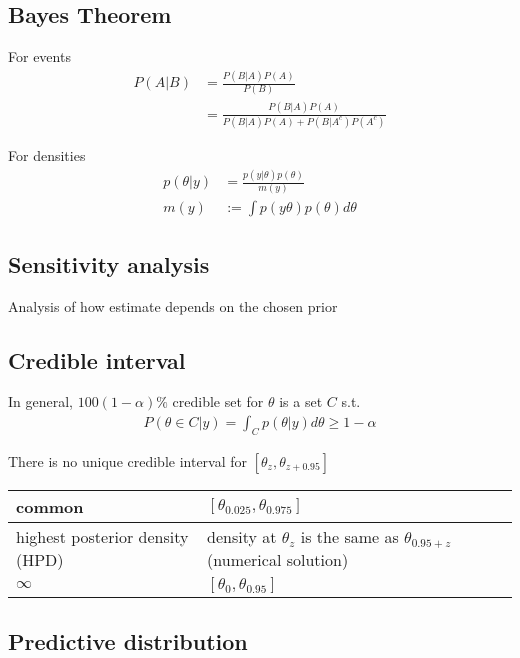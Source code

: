     \subsection{Bayes Theorem}
    For events
    \begin{align*}
        P(A|B) &= \frac{P(B|A)P(A)}{P(B)}\\
               &= \frac{P(B|A)P(A)}{P(B|A)P(A)+P(B|A^c)P(A^c)}
    \end{align*}

    For densities
    \begin{align*}
        p(\theta|y) &= \frac{p(y|\theta)p(\theta)}{m(y)}\\
        m(y) &:= \int p(y\theta)p(\theta)d\theta
    \end{align*}

    \subsection{Sensitivity analysis}
    Analysis of how estimate depends on the chosen prior

    \subsection{Credible interval}

    In general, $100(1-\alpha)\%$ credible set for $\theta$
    is a set $C$ s.t.
    \begin{align*}
        P(\theta \in C | y) = \int_C p(\theta|y) d\theta
        \geq 1 - \alpha
    \end{align*}

    There is no unique credible interval for $[\theta_z,
    \theta_{z+0.95}]$
    \begin{tabulary}{\linewidth}{L | L}
        \hline
        common & $[\theta_{0.025}, \theta_{0.975}]$\\
        \hline
        highest posterior density (HPD) & density at
        $\theta_z$ is the same as $\theta_{0.95+z}$
        (numerical solution)\\
        \hline
        $\infty$ & $[\theta_0, \theta_{0.95}]$\\
        \hline
    \end{tabulary}

    \subsection{Predictive distribution}

